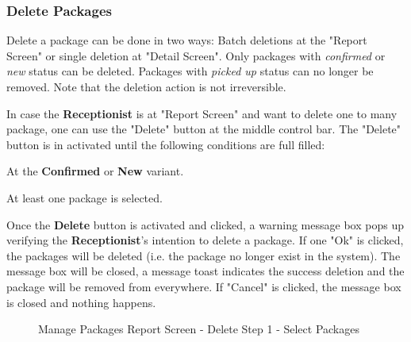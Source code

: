 \subsubsection{Delete Packages}

Delete a package can be done in two ways: Batch deletions at the "Report Screen" or single deletion at "Detail Screen". Only packages with \textit{confirmed} or \textit{new} status can be deleted. Packages with \textit{picked up} status can no longer be removed. Note that the deletion action is not irreversible.

\bigskip
In case the \textbf{Receptionist} is at "Report Screen" and want to delete one to many package, one can use the "Delete" button at the middle control bar. The "Delete" button is in activated until the following conditions are full filled:

\begin{compactenum}
    \item At the \textbf{Confirmed} or \textbf{New} variant.
    \item At least one package is selected.
\end{compactenum}

\bigskip
Once the \textbf{Delete} button is activated and clicked, a warning message box pops up verifying the \textbf{Receptionist}'s intention to delete a package. If one "Ok" is clicked, the packages will be deleted (i.e. the package no longer exist in the system). The message box will be closed, a message toast indicates the success deletion and the package will be removed from everywhere. If "Cancel" is clicked, the message box is closed and nothing happens.

\begin{figure}[H]
	\centering

    \caption{Manage Packages Report Screen - Delete Step 1 - Select Packages}
	\label{fig:MPReportDeleteBtn}
\end{figure}

